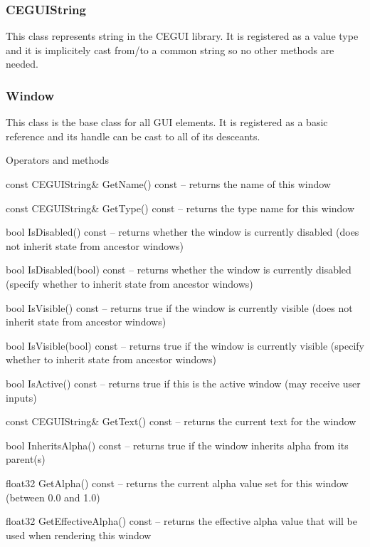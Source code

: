 \subsubsection{CEGUIString}

This class represents string in the CEGUI library. It is registered as a value type and it is implicitely cast from/to a common string so no other methods are needed.

\subsubsection{Window}

This class is the base class for all GUI elements. It is registered as a basic reference and its handle can be cast to all of its desceants.

\begin{titled-itemize}{Operators and methods}
  \item const CEGUIString\& GetName() const -- returns the name of this window
  \item const CEGUIString\& GetType() const -- returns the type name for this window
  \item bool IsDisabled() const -- returns whether the window is currently disabled (does not inherit state from ancestor windows)
  \item bool IsDisabled(bool) const -- returns whether the window is currently disabled (specify whether to inherit state from ancestor windows)
  \item bool IsVisible() const -- returns true if the window is currently visible (does not inherit state from ancestor windows)
  \item bool IsVisible(bool) const -- returns true if the window is currently visible (specify whether to inherit state from ancestor windows)
  \item bool IsActive() const -- returns true if this is the active window (may receive user inputs)
  \item const CEGUIString& GetText() const -- returns the current text for the window
  \item bool InheritsAlpha() const -- returns true if the window inherits alpha from its parent(s)
  \item float32 GetAlpha() const -- returns the current alpha value set for this window (between 0.0 and 1.0)
  \item float32 GetEffectiveAlpha() const -- returns the effective alpha value that will be used when rendering this
 window

\end{titled-itemize}
